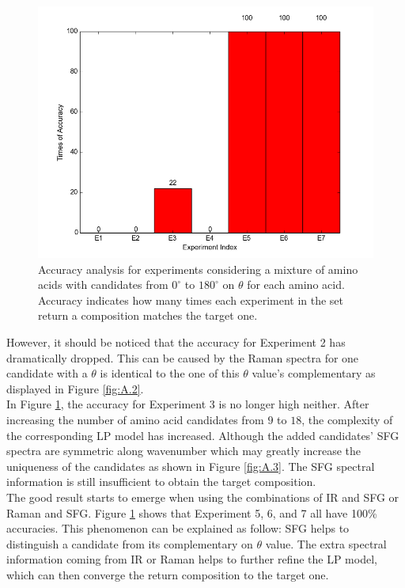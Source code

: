 \begin{figure}[!ht]
\centering
\includegraphics[scale=0.7]{Figures/accuracy_pecent_result10_mixture.png}
\caption{Accuracy analysis for experiments considering a mixture of amino acids with candidates from $0^{\circ}$ to $180^{\circ}$ on $\theta$ for each amino acid. Accuracy indicates how many times each experiment in the set return a composition matches the target one.} \label{fig:5.3}
\end{figure}

However, it should be noticed that the accuracy for Experiment 2 has dramatically dropped. This can be caused by the Raman spectra for one candidate with a $\theta$ is identical to the one of this $\theta$ value's complementary as displayed in Figure \ref{fig:A.2}. \\

In Figure \ref{fig:5.3}, the accuracy for Experiment 3 is no longer high neither. After increasing the number of amino acid candidates from $9$ to $18$, the complexity of the corresponding LP model has increased. Although the added candidates' SFG spectra are symmetric along wavenumber which may greatly increase the uniqueness of the candidates as shown in Figure \ref{fig:A.3}. The SFG spectral information is still insufficient to obtain the target composition. \\

The good result starts to emerge when using the combinations of IR and SFG or Raman and SFG. Figure \ref{fig:5.3} shows that Experiment 5, 6, and 7 all have 100\% accuracies. This phenomenon can be explained as follow: SFG helps to distinguish a candidate from its complementary on $\theta$ value. The extra spectral information coming from IR or Raman helps to further refine the LP model, which can then converge the return composition to the target one. \\

